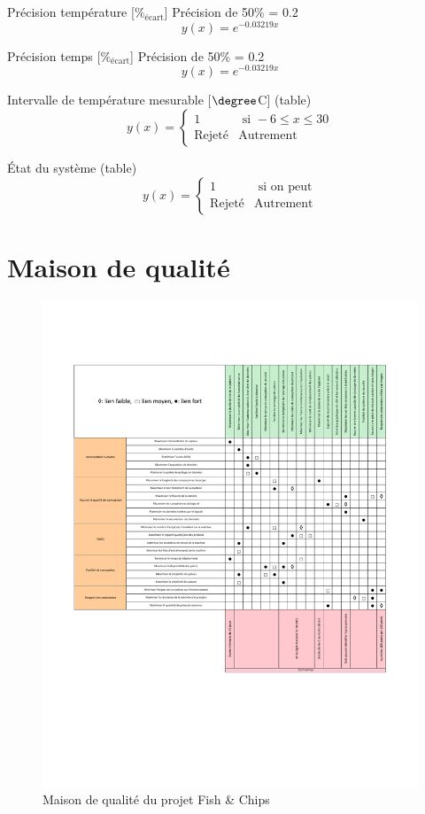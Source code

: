 Précision température [$\%_\text{écart}$]
Précision de 50\% = 0.2
\begin{equation}
    y(x) = e^{-0.03219x}
    \label{eq:bareme_precision_temperature}
\end{equation}

Précision temps [$\%_\text{écart}$]
Précision de 50\% = 0.2
\begin{equation}
    y(x) = e^{-0.03219x}
    \label{eq:bareme_precision_temps}
\end{equation}

Intervalle de température mesurable [$\degree$C] (table)
\begin{equation}
y(x) = \begin{cases}
    1 & \text{ si } -6 \leq x \leq 30\\
    \text{Rejeté} & \text{Autrement}
    \end{cases}
    \label{eq:bareme_mesure_temperature}
\end{equation}

État du système (table)
\begin{equation}
y(x) = \begin{cases}
    1 & \text{ si on peut}\\
    \text{Rejeté} & \text{Autrement}
    \end{cases}
    \label{eq:bareme_etat_systeme}
\end{equation}

\newpage


\section{Maison de qualité}

\begin{figure}[htb!]
    \centering
    \includegraphics[width=0.90\linewidth]{fig/maison_de_qualite.pdf}
    \caption{Maison de qualité du projet Fish \& Chips}
    \label{fig:maison_qualite}
\end{figure}
